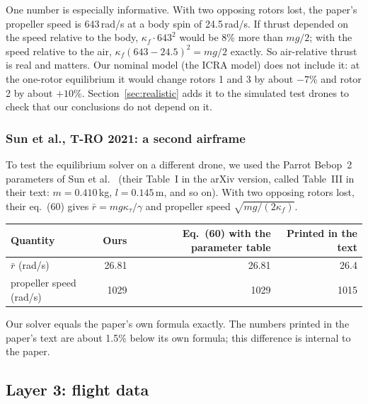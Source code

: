 One number is especially informative. With two opposing rotors lost, the paper's propeller speed is 643\,rad/s at a body spin of 24.5\,rad/s. If thrust depended on the speed relative to the body, $\kappa_f\cdot643^2$ would be 8\% more than $mg/2$; with the speed relative to the air, $\kappa_f(643-24.5)^2 = mg/2$ exactly. So air-relative thrust is real and matters. Our nominal model (the ICRA model) does not include it: at the one-rotor equilibrium it would change rotors 1 and 3 by about $-7$\% and rotor 2 by about $+10$\%. Section~\ref{sec:realistic} adds it to the simulated test drones to check that our conclusions do not depend on it.

\subsubsection{Sun et al., T-RO 2021: a second airframe}
To test the equilibrium solver on a different drone, we used the Parrot Bebop~2 parameters of Sun et al.~\cite{sun2020incremental} (their Table~I in the arXiv version, called Table~III in their text: $m=0.410$\,kg, $l=0.145$\,m, and so on). With two opposing rotors lost, their eq.~(60) gives $\bar r = mg\kappa_\tau/\gamma$ and propeller speed $\sqrt{mg/(2\kappa_f)}$.

\begin{center}\small
\begin{tabular}{lrrr}
\toprule
Quantity & Ours & Eq.~(60) with the parameter table & Printed in the text \\
\midrule
$\bar r$ (rad/s) & 26.81 & 26.81 & 26.4 \\
propeller speed (rad/s) & 1029 & 1029 & 1015 \\
\bottomrule
\end{tabular}
\end{center}
Our solver equals the paper's own formula exactly. The numbers printed in the paper's text are about 1.5\% below its own formula; this difference is internal to the paper.

\subsection{Layer 3: flight data}
